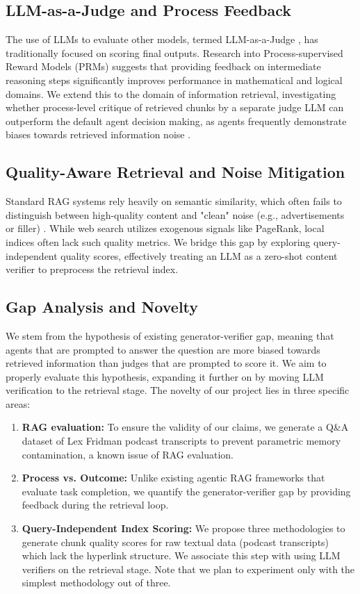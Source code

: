 \documentclass[11pt]{article}
\begin{document}
\subsection{LLM-as-a-Judge and Process Feedback}
The use of LLMs to evaluate other models, termed LLM-as-a-Judge \citep{zheng2023judgingllmasajudgemtbenchchatbot}, has traditionally focused on scoring final outputs. Research into Process-supervised Reward Models (PRMs) \citep{lightman2023letsverifystepstep} suggests that providing feedback on intermediate reasoning steps significantly improves performance in mathematical and logical domains. We extend this to the domain of information retrieval, investigating whether process-level critique of retrieved chunks by a separate judge LLM can outperform the default agent decision making, as agents frequently demonstrate biases towards retrieved information noise \citep{liu2023lostmiddlelanguagemodels}.

\subsection{Quality-Aware Retrieval and Noise Mitigation}
Standard RAG systems rely heavily on semantic similarity, which often fails to distinguish between high-quality content and "clean" noise (e.g., advertisements or filler) \citep{Cuconasu_2024}. While web search utilizes exogenous signals like PageRank, local indices often lack such quality metrics. We bridge this gap by exploring query-independent quality scores, effectively treating an LLM as a zero-shot content verifier to preprocess the retrieval index.

\subsection{Gap Analysis and Novelty}
We stem from the hypothesis of existing generator-verifier gap, meaning that agents that are prompted to answer the question are more biased towards retrieved information than judges that are prompted to score it. We aim to properly evaluate this hypothesis, expanding it further on by moving LLM verification to the retrieval stage.
The novelty of our project lies in three specific areas:
\begin{enumerate}
\item \textbf{RAG evaluation:}
To ensure the validity of our claims, we generate a Q\&A dataset of Lex Fridman podcast transcripts to prevent parametric memory contamination, a known issue of RAG evaluation. 
\item \textbf{Process vs. Outcome:} Unlike existing agentic RAG frameworks that evaluate task completion, we quantify the generator-verifier gap by providing feedback during the retrieval loop.
\item \textbf{Query-Independent Index Scoring:} We propose three methodologies to generate chunk quality scores for raw textual data (podcast transcripts) which lack the hyperlink structure. We associate this step with using LLM verifiers on the retrieval stage. Note that we plan to experiment only with the simplest methodology out of three.
\end{enumerate}
\end{document}
